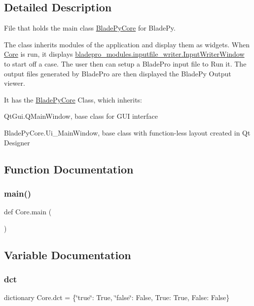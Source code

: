 \subsection{Detailed Description}
File that holds the main class \hyperlink{a00078}{Blade\+Py\+Core} for Blade\+Py. 

The class inherits modules of the application and display them as widgets. When \hyperlink{a00050}{Core} is run, it displays \hyperlink{a00070}{bladepro\+\_\+modules.\+inputfile\+\_\+writer.\+Input\+Writer\+Window} to start off a case. The user then can setup a Blade\+Pro input file to Run it. The output files generated by Blade\+Pro are then displayed the Blade\+Py Output viewer.

It has the \hyperlink{a00078}{Blade\+Py\+Core} Class, which inherits\+:

\begin{DoxyItemize}
\item {\ttfamily Qt\+Gui.\+Q\+Main\+Window}, base class for G\+UI interface \item {\ttfamily Blade\+Py\+Core.\+Ui\+\_\+\+Main\+Window}, base class with function-\/less layout created in Qt Designer \end{DoxyItemize}


\subsection{Function Documentation}
\hypertarget{a00050_abbe2fb717a0d4efddde9090f186bd64b}{}\label{a00050_abbe2fb717a0d4efddde9090f186bd64b} 
\subsubsection{\texorpdfstring{main()}{main()}}
{\footnotesize\ttfamily def Core.\+main (\begin{DoxyParamCaption}{ }\end{DoxyParamCaption})}



\subsection{Variable Documentation}
\hypertarget{a00050_a929c2310eb32ddd6da7fa2835f7f96d1}{}\label{a00050_a929c2310eb32ddd6da7fa2835f7f96d1} 
\subsubsection{\texorpdfstring{dct}{dct}}
{\footnotesize\ttfamily dictionary Core.\+dct = \{\char`\"{}true\char`\"{}\+: True, \char`\"{}false\char`\"{}\+: False, True\+: True, False\+: False\}}

